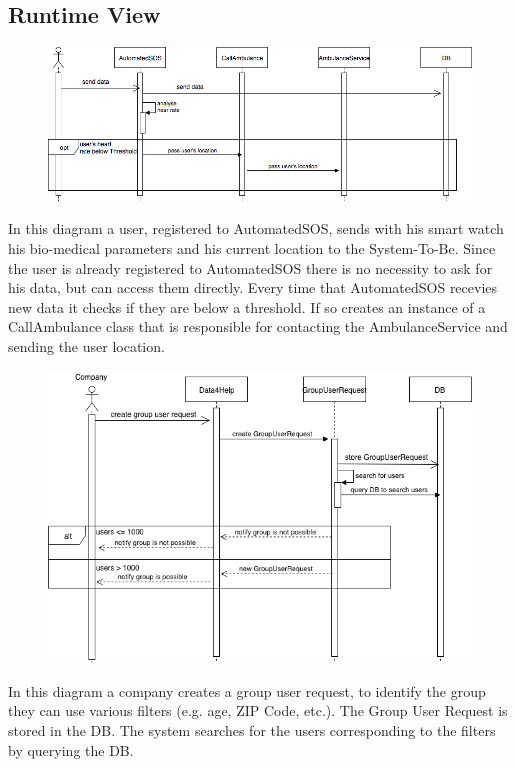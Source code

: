 \documentclass{article}
\begin{document}
\subsection{Runtime View}
\begin{figure}[h!]
\centering
    \textbf{}\par\medskip
	\includegraphics[width= \linewidth]{callambulance.png}
\end{figure}
In this diagram a user, registered to AutomatedSOS, sends with his smart watch his bio-medical parameters and his current location to the System-To-Be. Since the user is already registered to AutomatedSOS there is no necessity to ask for his data, but can access them directly.\newline
Every time that AutomatedSOS recevies new data it checks if they are below a threshold. If so creates an instance of a CallAmbulance class that is responsible for contacting the AmbulanceService and sending the user location.
\newpage
\begin{figure}[h!]
\centering
    \textbf{}\par\medskip
	\includegraphics[width= \linewidth]{grouprequest.png}
\end{figure}
In this diagram a company creates a group user request, to identify the group they can use various filters (e.g. age, ZIP Code, etc.). The Group User Request is stored in the DB. The system searches for the users corresponding to the filters by querying the DB.\newline
\end{document}
